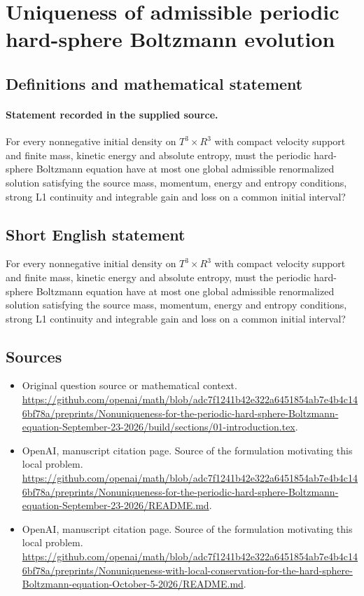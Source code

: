 \documentclass[11pt]{article}
\begin{document}
\section*{Uniqueness of admissible periodic hard-sphere Boltzmann evolution}\label{30007332}
\subsection{Definitions and mathematical statement}
\paragraph{Statement recorded in the supplied source.}
For every nonnegative initial density on $T^3×R^3$ with compact velocity support and finite mass, kinetic energy and absolute entropy, must the periodic hard-sphere Boltzmann equation have at most one global admissible renormalized solution satisfying the source mass, momentum, energy and entropy conditions, strong L1 continuity and integrable gain and loss on a common initial interval?
\subsection{Short English statement}
For every nonnegative initial density on $T^3×R^3$ with compact velocity support and finite mass, kinetic energy and absolute entropy, must the periodic hard-sphere Boltzmann equation have at most one global admissible renormalized solution satisfying the source mass, momentum, energy and entropy conditions, strong L1 continuity and integrable gain and loss on a common initial interval?
\subsection{Sources}
\begin{itemize}
\item[S1] Original question source or mathematical context.
\url{https://github.com/openai/math/blob/adc7f1241b42e322a6451854ab7e4b4c146bf78a/preprints/Nonuniqueness-for-the-periodic-hard-sphere-Boltzmann-equation-September-23-2026/build/sections/01-introduction.tex}.
\item[S2] OpenAI, manuscript citation page. Source of the formulation motivating this local problem.
\url{https://github.com/openai/math/blob/adc7f1241b42e322a6451854ab7e4b4c146bf78a/preprints/Nonuniqueness-for-the-periodic-hard-sphere-Boltzmann-equation-September-23-2026/README.md}.
\item[S3] OpenAI, manuscript citation page. Source of the formulation motivating this local problem.
\url{https://github.com/openai/math/blob/adc7f1241b42e322a6451854ab7e4b4c146bf78a/preprints/Nonuniqueness-with-local-conservation-for-the-hard-sphere-Boltzmann-equation-October-5-2026/README.md}.
\end{itemize}
\end{document}

